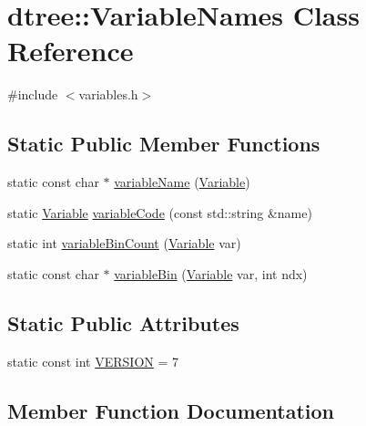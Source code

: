 \hypertarget{classdtree_1_1_variable_names}{}\section{dtree\+::Variable\+Names Class Reference}
\label{classdtree_1_1_variable_names}


{\ttfamily \#include $<$variables.\+h$>$}

\subsection*{Static Public Member Functions}
\begin{DoxyCompactItemize}
\item 
static const char $\ast$ \mbox{\hyperlink{classdtree_1_1_variable_names_a3fd22144a6f569e4c5c342bf44e84a50}{variable\+Name}} (\mbox{\hyperlink{namespacedtree_a79fe30831a14df904319f9e783b3189b}{Variable}})
\item 
static \mbox{\hyperlink{namespacedtree_a79fe30831a14df904319f9e783b3189b}{Variable}} \mbox{\hyperlink{classdtree_1_1_variable_names_a04a575b3bd46b5470146b25c115b660c}{variable\+Code}} (const std\+::string \&name)
\item 
static int \mbox{\hyperlink{classdtree_1_1_variable_names_ab1bf52dec56ba3a391c1cb0a3734fa27}{variable\+Bin\+Count}} (\mbox{\hyperlink{namespacedtree_a79fe30831a14df904319f9e783b3189b}{Variable}} var)
\item 
static const char $\ast$ \mbox{\hyperlink{classdtree_1_1_variable_names_a0809e9e3859dcc20ebe96b8f1ef6e374}{variable\+Bin}} (\mbox{\hyperlink{namespacedtree_a79fe30831a14df904319f9e783b3189b}{Variable}} var, int ndx)
\end{DoxyCompactItemize}
\subsection*{Static Public Attributes}
\begin{DoxyCompactItemize}
\item 
static const int \mbox{\hyperlink{classdtree_1_1_variable_names_a8dbf2bca55b63f43dc189bcee9add901}{V\+E\+R\+S\+I\+ON}} = 7
\end{DoxyCompactItemize}


\subsection{Member Function Documentation}
\mbox{\label{classdtree_1_1_variable_names_a0809e9e3859dcc20ebe96b8f1ef6e374}} 
